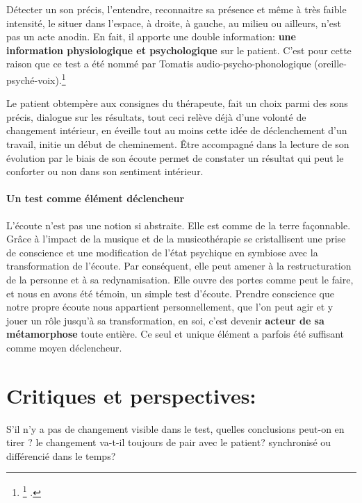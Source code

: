 
 Détecter un son précis, l'entendre, reconnaitre sa présence et même à très
 faible intensité, le situer dans l'espace, à droite, à gauche, au
 milieu ou ailleurs, n'est pas un acte anodin. En fait,  il apporte
 une double information: \textbf{une information
   physiologique et psychologique} sur le patient.
 C'est pour cette raison que ce test a été nommé par Tomatis
 audio-psycho-phonologique (oreille-psyché-voix).\footnote{\footnote{Avec le professeur Tomatis: formation suivie dès 1995, Boulevard de Courcelles, Centre de l'écoute 
Tomatis à Paris; puis en 2009/11/13/15 avec V. Gas, V. Drouot et J.P. Granier, formateurs et consultants. Source: site internet officiel: \cite{tomatis.com}.}
.}

 Le patient obtempère aux consignes du thérapeute, fait un choix parmi des sons précis, dialogue sur les résultats, tout ceci relève déjà d'une volonté de changement intérieur, en  éveille tout au moins cette idée de déclenchement d'un travail, initie un début de cheminement.
Être accompagné dans la lecture de son évolution par le biais de
son écoute  permet de constater un résultat qui  peut le conforter ou non dans son sentiment intérieur.
        
\paragraph{Un test comme élément déclencheur}

L'écoute n'est pas une notion si abstraite. Elle est comme de la terre façonnable.
 Grâce à l'impact de la musique et de la musicothérapie se cristallisent
 une prise de conscience et une modification
 de  l'état psychique en symbiose avec la transformation de
 l'écoute. Par conséquent, elle peut amener à la restructuration de la personne et à
 sa redynamisation. Elle ouvre des portes comme peut le faire, et nous
 en avons été témoin, un simple test d'écoute. 
  Prendre conscience que notre propre écoute nous appartient
  personnellement, que l'on peut agir et y jouer un rôle jusqu'à sa
  transformation, en soi, c'est devenir \textbf{ acteur de sa
    métamorphose} toute entière.
  Ce seul et unique élément a parfois été suffisant comme moyen déclencheur.










\section{Critiques et perspectives: }
S'il n'y a pas de changement visible dans le test, quelles conclusions
peut-on en tirer ? le changement va-t-il toujours de pair avec le
patient? synchronisé ou différencié dans le temps?



